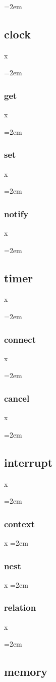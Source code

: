 \documentclass[a4paper]{article}
\let\oldsubsection\subsection
\renewcommand{\subsection}{\leftskip=2em \oldsubsection}
\let\oldsubsubsection\subsubsection
\renewcommand{\subsubsection}{\leftskip=2em \oldsubsubsection}
\begin{document}
\subsection{clock}
x

\subsubsection{get}
x

\subsubsection{set}
x

\subsubsection{notify}
x


\subsection{timer}
x

\subsubsection{connect}
x

\subsubsection{cancel}

x

\subsection{interrupt}
x

\subsubsection{context}

x
\subsubsection{nest}

x
\subsubsection{relation}
x


\subsection{memory}
\end{document}
